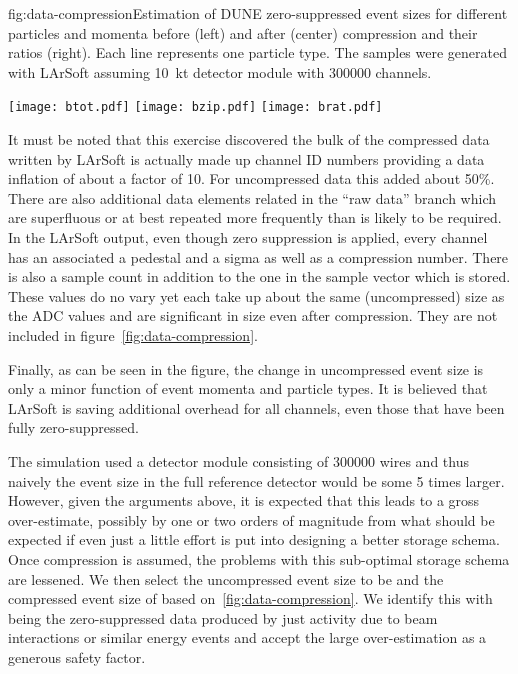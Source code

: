 \begin{cdrfigure}{fig:data-compression}{Estimation of DUNE zero-suppressed event sizes for
    different particles and momenta before (left) and after (center)
    compression and their ratios (right).
    Each line represents one particle type.
    The samples were generated with LArSoft assuming
    \SI{10}{\kilo\tonne} detector module with \num{300000} channels.}

  \texttt{[image: btot.pdf]}
  \texttt{[image: bzip.pdf]}
  \texttt{[image: brat.pdf]}

\end{cdrfigure}

It must be noted that this exercise discovered the bulk of the
compressed data written by LArSoft is actually made up channel ID
numbers providing a data inflation of about a factor of 10.
For uncompressed data this added about 50\%.
There are also additional data elements related in the ``raw data''
branch which are superfluous or at best repeated more frequently than
is likely to be required.
In the LArSoft output, even though zero suppression is applied, every
channel has an associated a pedestal and a sigma as well as a
compression number.
There is also a sample count in addition to the one in the sample
vector which is stored.
These values do no vary yet each take up about the same (uncompressed)
size as the ADC values and are significant in size even after
compression.
They are not included in figure~\ref{fig:data-compression}.

Finally, as can be seen in the figure, the change in uncompressed
event size is only a minor function of event momenta and particle types.
It is believed that LArSoft is saving additional overhead for all
channels, even those that have been fully zero-suppressed.

The simulation used a detector module consisting of \num{300000} wires and
thus naively the event size in the full reference detector would be some 5 times
larger.
However, given the arguments above, it is expected that this leads to
a gross over-estimate, possibly by one or two orders of magnitude from
what should be expected if even just a little effort is put into
designing a better storage schema.
Once compression is assumed, the problems with this sub-optimal
storage schema are lessened.
We then select the uncompressed event size to be \beameventsize and
the compressed event size of \beameventsizecompressed based
on~\ref{fig:data-compression}.
We identify this with being the zero-suppressed data produced by just
activity due to beam interactions or similar energy events and accept
the large over-estimation as a generous safety factor.






